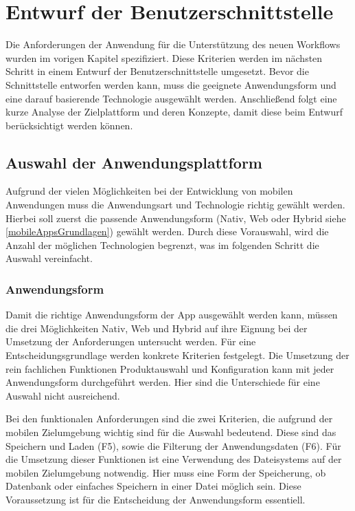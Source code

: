 \chapter{Entwurf der Benutzerschnittstelle}\label{chapter_4}
Die Anforderungen der Anwendung für die Unterstützung des neuen Workflows wurden im vorigen Kapitel spezifiziert. Diese Kriterien werden im nächsten Schritt in einem Entwurf der Benutzerschnittstelle umgesetzt. Bevor die Schnittstelle entworfen werden kann, muss die geeignete Anwendungsform und eine darauf basierende Technologie ausgewählt werden. Anschließend folgt eine kurze Analyse der Zielplattform und deren Konzepte, damit diese beim Entwurf berücksichtigt werden können.

\section{Auswahl der Anwendungsplattform}
Aufgrund der vielen Möglichkeiten bei der Entwicklung von mobilen Anwendungen muss die Anwendungsart und Technologie richtig gewählt werden. Hierbei soll zuerst die passende Anwendungsform (Nativ, Web oder Hybrid siehe \ref{mobileAppsGrundlagen}) gewählt werden. Durch diese Vorauswahl, wird die Anzahl der möglichen Technologien begrenzt, was im folgenden Schritt die Auswahl vereinfacht.


\subsection{Anwendungsform}
Damit die richtige Anwendungsform der App ausgewählt werden kann, müssen die drei Möglichkeiten Nativ, Web und Hybrid auf ihre Eignung bei der Umsetzung der Anforderungen untersucht werden. Für eine Entscheidungsgrundlage werden konkrete Kriterien festgelegt. 
Die Umsetzung der rein fachlichen Funktionen Produktauswahl und Konfiguration kann mit jeder Anwendungsform durchgeführt werden. Hier sind die Unterschiede für eine Auswahl nicht ausreichend. \par

Bei den  funktionalen Anforderungen sind die zwei Kriterien, die aufgrund der mobilen Zielumgebung wichtig sind für die Auswahl bedeutend. Diese sind das Speichern und Laden (F5), sowie die Filterung der Anwendungsdaten (F6). Für die Umsetzung dieser Funktionen ist eine Verwendung des Dateisystems auf der mobilen Zielumgebung notwendig. Hier muss eine Form der Speicherung, ob Datenbank oder einfaches Speichern in einer Datei möglich sein. Diese Voraussetzung ist für die Entscheidung der Anwendungsform essentiell. \par

